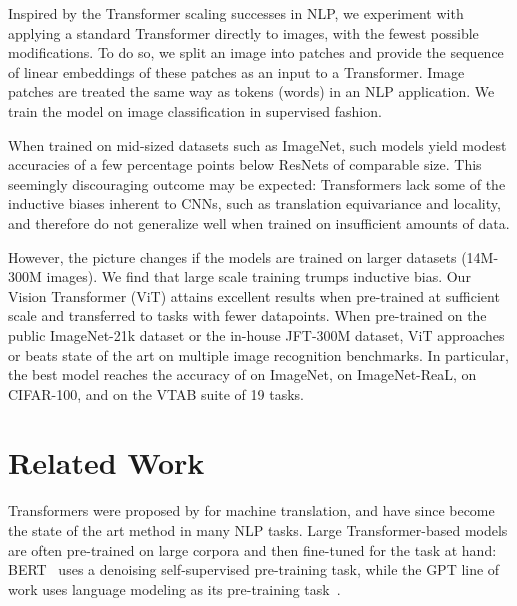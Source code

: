 \documentclass{article} \usepackage{iclr2021_conference,times}
\newcommand{\oursabbrv}{ViT\xspace}
\newcommand{\oursfull}{Vision Transformer\xspace}
\newcommand{\imagenet}{ImageNet\xspace}
\begin{document}
Inspired by the Transformer scaling successes in NLP, we experiment with applying a standard Transformer directly to images, with the fewest possible modifications.
To do so, we split an image into patches and provide the sequence of linear embeddings of these patches as an input to a Transformer.
Image patches are treated the same way as tokens (words) in an NLP application.
We train the model on image classification in supervised fashion.

When trained on mid-sized datasets such as \imagenet, such models yield modest accuracies of a few percentage points below ResNets of comparable size.
This seemingly discouraging outcome may be expected: Transformers lack some of the inductive biases inherent to CNNs, such as translation equivariance and locality, and therefore do not generalize well when trained on insufficient amounts of data.

However, the picture changes if the models are trained on larger datasets (14M-300M images). 
We find that large scale training trumps inductive bias.
Our \oursfull{} (\oursabbrv{}) attains excellent results when pre-trained at sufficient scale and transferred to tasks with fewer datapoints.
When pre-trained on the public ImageNet-21k dataset or the in-house JFT-300M dataset, \oursabbrv{} approaches or beats state of the art on multiple image recognition benchmarks.
In particular, the best model reaches the accuracy of  on \imagenet,  on \imagenet-ReaL,  on CIFAR-100, and  on the VTAB suite of 19 tasks.















 \section{Related Work}
Transformers were proposed by \citet{vaswani2017} for machine translation, and have since become the state of the art method in many NLP tasks. Large Transformer-based models are often pre-trained on large corpora and then fine-tuned for the task at hand: BERT~\citep{devlin19-bert} uses a denoising self-supervised pre-training task, while the GPT line of work uses language modeling as its pre-training task~\citep{radford2018-gpt,radford2019-gpt2,brown2020-gpt3}.
\end{document}
